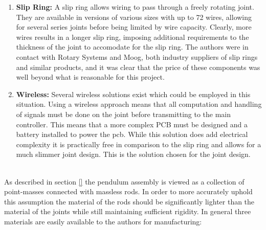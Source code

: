 \begin{enumerate}
  	\item \textbf{Slip Ring:} A slip ring allows wiring to pass through a freely rotating joint.
  	They are available in versions of various sizes with up to 72 wires, allowing for several series joints before being limited by wire capacity.
  	Clearly, more wires results in a longer slip ring, imposing additional requirements to the thickness of the joint to accomodate for the slip ring.
  	The authors were in contact with Rotary Systems and Moog, both industry suppliers of slip rings and similar products, and it was clear that the price of these components was well beyond what is reasonable for this project.
  	\item \textbf{Wireless:} Several wireless solutions exist which could be employed in this situation.
  	Using a wireless approach means that all computation and handling of signals must be done on the joint before transmitting to the main controller.
  	This means that a more complex PCB must be designed and a battery installed to power the pcb.
  	While this solution does add electrical complexity it is practically free in comparison to the slip ring and allows for a much slimmer joint design.
  	This is the solution chosen for the joint design.
\end{enumerate}
~\\
As described in section \ref{} the pendulum assembly is viewed as a collection of point-masses connected with massless rods.
In order to more accurately uphold this assumption the material of the rods should be significantly lighter than the material of the joints while still maintaining sufficient rigidity.
In general three materials are easily available to the authors for manufacturing:

